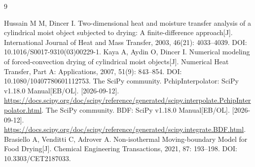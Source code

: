 \begin{thebibliography}{9}
\small\raggedright
{} Hussain M M, Dincer I. Two-dimensional heat and moisture transfer analysis of a cylindrical moist object subjected to drying: A finite-difference approach[J]. International Journal of Heat and Mass Transfer, 2003, 46(21): 4033--4039. DOI: 10.1016/S0017-9310(03)00229-1.
 Kaya A, Aydin O, Dincer I. Numerical modeling of forced-convection drying of cylindrical moist objects[J]. Numerical Heat Transfer, Part A: Applications, 2007, 51(9): 843--854. DOI: 10.1080/10407780601112753.
 The SciPy community. PchipInterpolator: SciPy v1.18.0 Manual[EB/OL]. [2026-09-12]. \url{https://docs.scipy.org/doc/scipy/reference/generated/scipy.interpolate.PchipInterpolator.html}.
 The SciPy community. BDF: SciPy v1.18.0 Manual[EB/OL]. [2026-09-12]. \url{https://docs.scipy.org/doc/scipy/reference/generated/scipy.integrate.BDF.html}.
 Brasiello A, Venditti C, Adrover A. Non-isothermal Moving-boundary Model for Food Drying[J]. Chemical Engineering Transactions, 2021, 87: 193--198. DOI: 10.3303/CET2187033.
\end{thebibliography}
